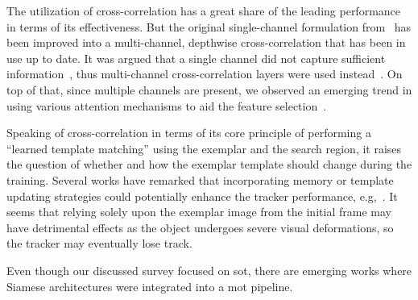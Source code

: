 The utilization of cross-correlation has a great share of the leading performance in terms of its effectiveness. But the original single-channel formulation from~\cite{bertinetto2016siamfc} has been improved into a multi-channel, depthwise cross-correlation that has been in use up to date. It was argued that a single channel did not capture sufficient information~\cite{guo2019siamcar}, thus multi-channel cross-correlation layers were used instead~\cite{li2018siamrpnpp}. On top of that, since multiple channels are present, we observed an emerging trend in using various attention mechanisms to aid the feature selection~\cite{wang2018learningattentions}.

Speaking of cross-correlation in terms of its core principle of performing a ``learned template matching'' using the exemplar and the search region, it raises the question of whether and how the exemplar template should change during the training. Several works have remarked that incorporating memory or template updating strategies could potentially enhance the tracker performance, e.g,~\cite{bertinetto2016siamfc, liang2019lssiam}. It seems that relying solely upon the exemplar image from the initial frame may have detrimental effects as the object undergoes severe visual deformations, so the tracker may eventually lose track.

Even though our discussed survey focused on \gls{sot}, there are emerging works where Siamese architectures were integrated into a \gls{mot} pipeline.
